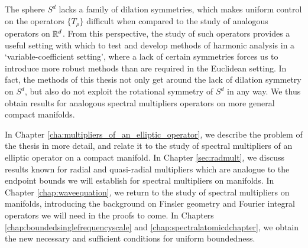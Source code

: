 The sphere $S^d$ lacks a family of dilation symmetries, which makes uniform control on the operators $\{ T_\rho \}$ difficult when compared to the study of analogous operators on $\operatorname{\mathbb{R}}^d$. From this perspective, the study of such operators provides a useful setting with which to test and develop methods of harmonic analysis in a `variable-coefficient setting', where a lack of certain symmetries forces us to introduce more robust methods than are required in the Euclidean setting.
%
%
%
In fact, the methods of this thesis not only get around the lack of dilation symmetry on $S^d$, but also do not exploit the rotational symmetry of $S^d$ in any way. We thus obtain results for analogous spectral multipliers operators on more general compact manifolds.
%

In Chapter \ref{cha:multipliers_of_an_elliptic_operator}, we describe the problem of the thesis in more detail, and relate it to the study of spectral multipliers of an elliptic operator on a compact manifold. In Chapter \ref{sec:radmult}, we discuss results known for radial and quasi-radial multipliers which are analogue to the endpoint bounds we will establish for spectral multipliers on manifolds. In Chapter \ref{chap:waveequation}, we return to the study of spectral multipliers on manifolds, introducing the background on Finsler geometry and Fourier integral operators we will need in the proofs to come. In Chapters \ref{chap:boundedsinglefrequencyscale} and \ref{chap:spectralatomicdchapter}, we obtain the new necessary and sufficient conditions for uniform boundedness.%